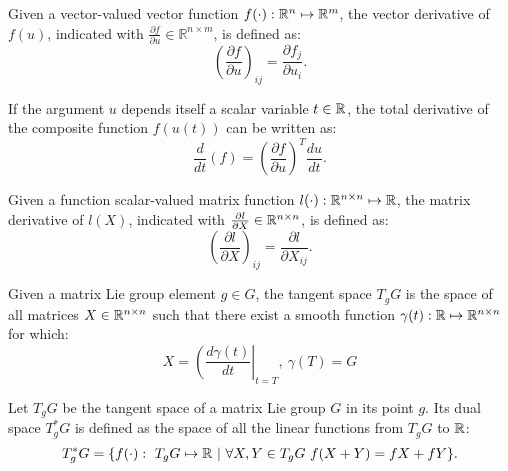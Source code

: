 \begin{definition}
Given a vector-valued vector function $f(\cdot) : \mathbb{R}^{n} \mapsto \mathbb{R}^{m}$, the vector derivative of $f(u)$, indicated with $\frac{\partial f}{\partial u} \in \mathbb{R}^{n \times m}$, is defined as:
\begin{equation}
\left( \frac{\partial f}{\partial u} \right)_{ij} = 
\frac{\partial f_j}{\partial u_{i}}.
\end{equation}

If the argument $u$ depends itself a scalar variable $t \in \mathbb{R}$, the total derivative of the composite function $f(u(t))$ can be written as:
\begin{equation}
\frac{d}{dt} \left( f \right) = \left( \frac{\partial f}{\partial u} \right)^T \frac{d u}{dt}.
\end{equation}

\end{definition}

\begin{definition}
Given a function scalar-valued matrix function $l(\cdot) : \mathbb{R}^{n \times n} \mapsto \mathbb{R}$, the matrix derivative of $l(X)$, indicated with $\frac{\partial l}{\partial X} \in \mathbb{R}^{n \times n}$, is defined as:
\begin{equation}
\left( \frac{\partial l}{\partial X} \right)_{ij} = 
\frac{\partial l}{\partial X_{ij}}.
\end{equation}
\end{definition}

\begin{definition}
Given a matrix Lie group element $g \in G$, the tangent space $T_g G$ is the space of all matrices $X \in \mathbb{R}^{n \times n}$ such that there exist a smooth function $\gamma(t) : \mathbb{R} \mapsto \mathbb{R}^{n \times n}$ for which:
\begin{equation}
   X = \left( \frac{d \gamma(t)}{dt} \right|_{t = T}, \ \gamma(T) = G
\end{equation}
\end{definition}

\begin{definition}
Let $T_g G$ be the tangent space of a matrix Lie group $G$ in its point $g$. Its dual space $T_g^* G$ is defined as the space of all the linear functions from $T_g G$ to $\mathbb{R}$:
\begin{equation}
T_g^* G = \{ f(\cdot) : \ T_g G \mapsto \mathbb{R} \  | \  \forall X,Y \in T_g G \ f(X+Y) = fX + fY \} .
\end{equation} 
\end{definition}


